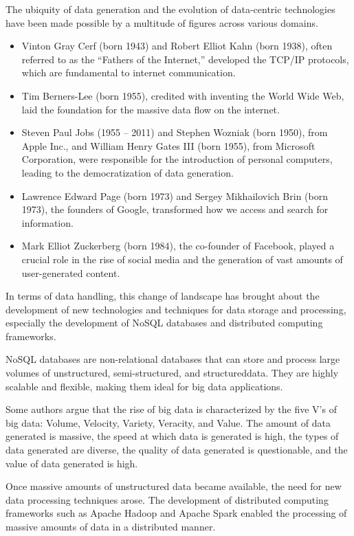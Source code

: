 The ubiquity of data generation and the evolution of data-centric technologies have been
made possible by a multitude of figures across various domains.

\begin{itemize}
  \itemsep0em
  \item Vinton Gray Cerf (born 1943) and Robert Elliot Kahn (born 1938), often referred to
    as the ``Fathers of the Internet,'' developed the TCP/IP protocols, which are
    fundamental to internet communication.
  \item Tim Berners-Lee (born 1955), credited with inventing the World Wide Web, laid the
    foundation for the massive data flow on the internet.
  \item Steven Paul Jobs (1955 -- 2011) and Stephen Wozniak (born 1950), from Apple Inc.,
    and William Henry Gates III (born 1955), from Microsoft Corporation, were responsible
    for the introduction of personal computers, leading to the democratization of data
    generation.
  \item Lawrence Edward Page (born 1973) and Sergey Mikhailovich Brin (born 1973), the
    founders of Google, transformed how we access and search for information.
  \item Mark Elliot Zuckerberg (born 1984), the co-founder of Facebook, played a crucial
    role in the rise of social media and the generation of vast amounts of user-generated
    content.
\end{itemize}

In terms of data handling, this change of landscape has brought about the
development of new technologies and techniques for data storage and processing, especially
the development of NoSQL databases and distributed computing frameworks.

NoSQL databases are non-relational databases that can store and process large volumes of
unstructured, semi-structured, and \gls{structureddata}.  They are highly scalable and
flexible, making them ideal for big data applications.

Some authors argue that the rise of big data is characterized by the five V's of big data:
Volume, Velocity, Variety, Veracity, and Value.  The amount of data generated is massive,
the speed at which data is generated is high, the types of data generated are diverse, the
quality of data generated is questionable, and the value of data generated is high.

Once massive amounts of unstructured data became available, the need for new data
processing techniques arose.  The development of distributed computing frameworks such as
Apache Hadoop and Apache Spark enabled the processing of massive amounts of data in a
distributed manner.

